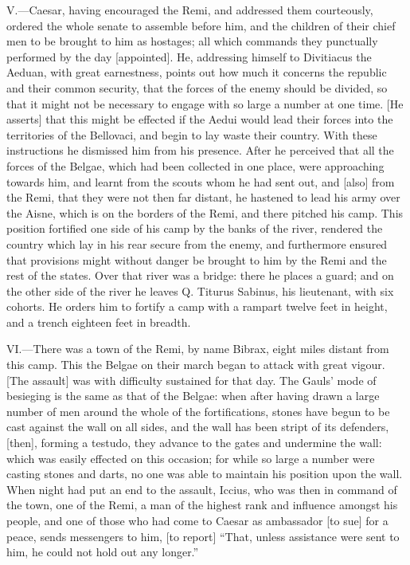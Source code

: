 V.—Caesar, having encouraged the Remi, and addressed them courteously,
ordered the whole senate to assemble before him, and the children of
their chief men to be brought to him as hostages; all which commands
they punctually performed by the day [appointed]. He, addressing himself
to Divitiacus the Aeduan, with great earnestness, points out how much it
concerns the republic and their common security, that the forces of the
enemy should be divided, so that it might not be necessary to engage
with so large a number at one time. [He asserts] that this might be
effected if the Aedui would lead their forces into the territories of
the Bellovaci, and begin to lay waste their country. With these
instructions he dismissed him from his presence. After he perceived that
all the forces of the Belgae, which had been collected in one place,
were approaching towards him, and learnt from the scouts whom he had
sent out, and [also] from the Remi, that they were not then far distant,
he hastened to lead his army over the Aisne, which is on the borders of
the Remi, and there pitched his camp. This position fortified one side
of his camp by the banks of the river, rendered the country which lay in
his rear secure from the enemy, and furthermore ensured that provisions
might without danger be brought to him by the Remi and the rest of the
states. Over that river was a bridge: there he places a guard; and on
the other side of the river he leaves Q. Titurus Sabinus, his
lieutenant, with six cohorts. He orders him to fortify a camp with a
rampart twelve feet in height, and a trench eighteen feet in breadth.

VI.—There was a town of the Remi, by name Bibrax, eight miles distant
from this camp. This the Belgae on their march began to attack with
great vigour. [The assault] was with difficulty sustained for that day.
The Gauls' mode of besieging is the same as that of the Belgae: when
after having drawn a large number of men around the whole of the
fortifications, stones have begun to be cast against the wall on all
sides, and the wall has been stript of its defenders, [then], forming a
testudo, they advance to the gates and undermine the wall: which was
easily effected on this occasion; for while so large a number were
casting stones and darts, no one was able to maintain his position upon
the wall. When night had put an end to the assault, Iccius, who was then
in command of the town, one of the Remi, a man of the highest rank and
influence amongst his people, and one of those who had come to Caesar as
ambassador [to sue] for a peace, sends messengers to him, [to report]
``That, unless assistance were sent to him, he could not hold out any
longer.''

